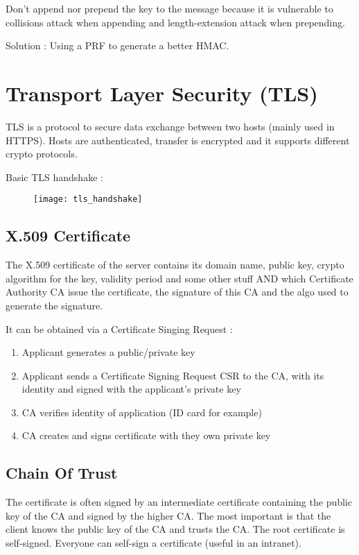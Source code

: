 Don't append nor prepend the key to the message because it is vulnerable to collisions attack when appending and length-extension attack when prepending.

Solution : Using a PRF to generate a better HMAC.

\chapter{Transport Layer Security (TLS)}

TLS is a protocol to secure data exchange between two hosts (mainly used in HTTPS). Hosts are
authenticated, transfer is encrypted and it supports different crypto protocols.

Basic TLS handshake :

\begin{figure}[H]
    \centering
    \texttt{[image: tls\_handshake]}
\end{figure}

\section{X.509 Certificate}

The X.509 certificate of the server contains its domain name, public key, crypto algorithm for the key, validity period and some other stuff AND which Certificate Authority CA issue the certificate, the signature of this CA and the algo used to generate the signature.

It can be obtained via a Certificate Singing Request :
\begin{enumerate}
    \item Applicant generates a public/private key
    \item Applicant sends a Certificate Signing Request CSR to the CA, with its identity and signed with the applicant's private key
    \item CA verifies identity of application (ID card for example)
    \item CA creates and signs certificate with they own private key
\end{enumerate}

\section{Chain Of Trust}

The certificate is often signed by an intermediate certificate containing the public key of the CA and signed by the higher CA. The most important is that the client knows the public key of the CA and trusts the CA. The root certificate is self-signed. Everyone can self-sign a certificate (useful in an intranet).

